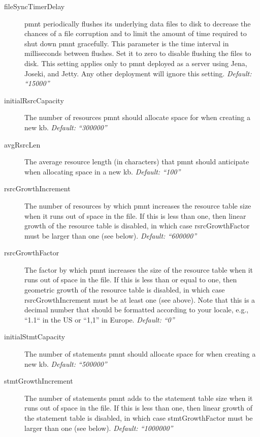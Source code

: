 \begin{description}
	\item[fileSyncTimerDelay] \ac{pmnt} periodically flushes its underlying data files to disk to decrease the chances of a file corruption and to limit the amount of time required to shut down \ac{pmnt} gracefully.  This parameter is the time interval in milliseconds between flushes.  Set it to zero to disable flushing the files to disk.  This setting applies only to \ac{pmnt} deployed as a server using Jena, Joseki, and Jetty.  Any other deployment will ignore this setting. \emph{Default: ``15000''}

	\item[initialRsrcCapacity] The number of resources \ac{pmnt} should allocate space for when creating a new \ac{kb}. \emph{Default: ``300000''}

	\item[avgRsrcLen] The average resource length (in characters) that \ac{pmnt} should anticipate when allocating space in a new \ac{kb}. \emph{Default: ``100''}

	\item[rsrcGrowthIncrement] The number of resources by which \ac{pmnt} increases the resource table size when it runs out of space in the file.  If this is less than one, then linear growth of the resource table is disabled, in which case rsrcGrowthFactor must be larger than one (see below). \emph{Default: ``600000''}

	\item[rsrcGrowthFactor] The factor by which \ac{pmnt} increases the size of the resource table when it runs out of space in the file.  If this is less than or equal to one, then geometric growth of the resource table is disabled, in which case rsrcGrowthIncrement must be at least one (see above).  Note that this is a decimal number that should be formatted according to your locale, e.g., ``1.1`` in the US or ``1,1'' in Europe. \emph{Default: ``0''}

	\item[initialStmtCapacity] The number of statements \ac{pmnt} should allocate space for when creating a new \ac{kb}. \emph{Default: ``500000''}

	\item[stmtGrowthIncrement] The number of statements \ac{pmnt} adds to the statement table size when it runs out of space in the file.  If this is less than one, then linear growth of the statement table is disabled, in which case stmtGrowthFactor must be larger than one (see below). \emph{Default: ``1000000''}


\end{description}
